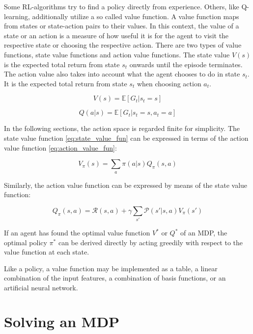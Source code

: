 Some RL-algorithms try to find a policy directly from experience. Others, like Q-learning, additionally utilize a so called value function. A value function maps from states or state-action pairs to their values. In this context, the value of a state or an action is a measure of how useful it is for the agent to visit the respective state or choosing the respective action. There are two types of value functions, state value functions and action value functions. The state value $V(s)$ is the expected total return from state $s_t$ onwards until the episode terminates. The action value also takes into account what the agent chooses to do in state $s_t$. It is the expected total return from state $s_t$ when choosing action $a_t$.

\begin{equation}
V(s) = \mathbb{E}[G_t|s_t=s]
\label{eq:state_value_fun}
\end{equation}

\begin{equation}
Q(a|s) = \mathbb{E}[G_t|s_t=s,a_t=a]
\label{eq:action_value_fun}
\end{equation}

In the following sections, the action space is regarded finite for simplicity.
The state value function \ref{eq:state_value_fun} can be expressed in terms of the action value function \ref{eq:action_value_fun}:

\begin{equation}
V_\pi(s) = \sum_{a}\pi(a|s)Q_\pi(s,a)
\label{eq:state_value_function_with_q}
\end{equation}

Similarly, the action value function can be expressed by means of the state value function:

\begin{equation}
Q_\pi(s,a)=\mathcal{R}(s,a)+\gamma \sum_{s'}\mathcal{P}(s'|s,a)V_\pi(s')
\label{eq:action_value_function_with_v}
\end{equation}

If an agent has found the optimal value function $V^*$ or $Q^*$ of an MDP, the optimal policy $\pi^*$ can be derived directly by acting greedily with respect to the value function at each state.

Like a policy, a value function may be implemented as a table, a linear combination of the input features, a combination of basis functions, or an artificial neural network.

\section{Solving an MDP}

